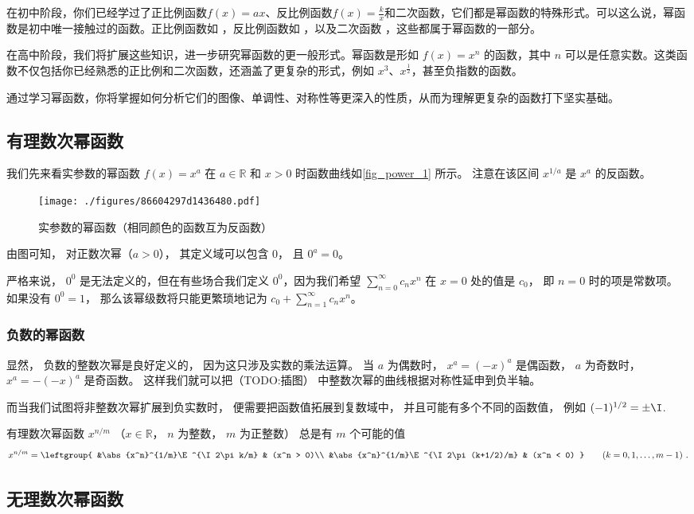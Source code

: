 


在初中阶段，你们已经学过了正比例函数$f(x) = ax$、反比例函数$f(x) = \frac{k}{x}$和二次函数，它们都是幂函数的特殊形式。可以这么说，幂函数是初中唯一接触过的函数。正比例函数如 ，反比例函数如 ，以及二次函数 ，这些都属于幂函数的一部分。

在高中阶段，我们将扩展这些知识，进一步研究幂函数的更一般形式。幂函数是形如 $f(x) = x^n$ 的函数，其中 $n$ 可以是任意实数。这类函数不仅包括你已经熟悉的正比例和二次函数，还涵盖了更复杂的形式，例如 $x^3$、$x^{\frac{1}{2}}$，甚至负指数的函数。

通过学习幂函数，你将掌握如何分析它们的图像、单调性、对称性等更深入的性质，从而为理解更复杂的函数打下坚实基础。


\subsection{有理数次幂函数}
我们先来看实参数的幂函数 $f(x) = x^a$ 在 $a\in\mathbb R$ 和 $x > 0$ 时函数曲线如\autoref{fig_power_1} 所示。 注意在该区间 $x^{1/a}$ 是 $x^a$ 的反函数。

\begin{figure}[ht]
\centering
\texttt{[image: ./figures/86604297d1436480.pdf]}
\caption{实参数的幂函数（相同颜色的函数互为反函数）}\label{fig_power_1}
\end{figure}

由图可知， 对正数次幂（$a > 0$）， 其定义域可以包含 $0$， 且 $0^a = 0$。

严格来说， $0^0$ 是无法定义的，但在有些场合我们定义 $0^0$，因为我们希望 $\sum_{n=0}^\infty c_n x^n$ 在 $x = 0$ 处的值是 $c_0$， 即 $n=0$ 时的项是常数项。 如果没有 $0^0 = 1$， 那么该幂级数将只能更繁琐地记为 $c_0 + \sum_{n=1}^\infty c_n x^n$。

\subsubsection{负数的幂函数}
显然， 负数的整数次幂是良好定义的， 因为这只涉及实数的乘法运算。 当 $a$ 为偶数时， $x^a = (-x)^a$ 是偶函数， $a$ 为奇数时， $x^a = -(-x)^a$ 是奇函数。 这样我们就可以把（TODO:插图） 中整数次幂的曲线根据对称性延申到负半轴。

而当我们试图将非整数次幂扩展到负实数时， 便需要把函数值拓展到复数域中， 并且可能有多个不同的函数值， 例如 $(-1)^{1/2} = \pm\I$. 

有理数次幂函数 $x^{n/m}$ （$x\in \mathbb R$， $n$ 为整数， $m$ 为正整数） 总是有 $m$ 个可能的值
\begin{equation}
x^{n/m} = \leftgroup{
&\abs{x^n}^{1/m}\E^{\I 2\pi k/m} & (x^n > 0)\\
&\abs{x^n}^{1/m}\E^{\I 2\pi (k+1/2)/m} & (x^n < 0)
}\qquad (k = 0,1,\dots, m-1)~.
\end{equation}

\subsection{无理数次幂函数}
